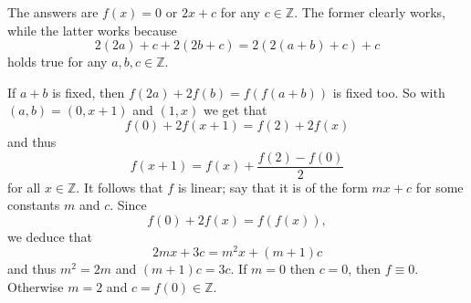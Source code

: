 The answers are $f(x)=0$ or $2x+c$ for any $c\in\mathbb{Z}$. The former clearly works, while the latter works because \[2(2a)+c+2(2b+c)=2(2(a+b)+c)+c\] holds true for any $a,b,c\in\mathbb{Z}$.

If $a+b$ is fixed, then $f(2a)+2f(b)=f(f(a+b))$ is fixed too. So with $(a,b)=(0,x+1)$ and $(1,x)$ we get that \[f(0)+2f(x+1)=f(2)+2f(x)\] and thus \[f(x+1)=f(x)+\frac{f(2)-f(0)}{2}\] for all $x\in\mathbb{Z}$. It follows that $f$ is linear; say that it is of the form $mx+c$ for some constants $m$ and $c$. Since \[f(0)+2f(x)=f(f(x)),\] we deduce that \[2mx+3c=m^2x+(m+1)c\] and thus $m^2=2m$ and $(m+1)c=3c$. If $m=0$ then $c=0$, then $f\equiv0$. Otherwise $m=2$ and $c=f(0)\in\mathbb{Z}$.